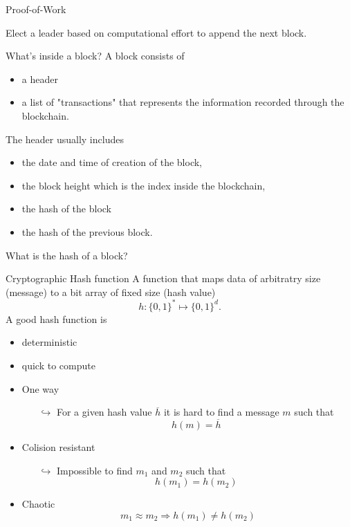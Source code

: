 \documentclass{beamer}
\begin{document}
\begin{frame}{Proof-of-Work}
\begin{tcolorbox}[enhanced,drop shadow, title=Objective]
    Elect a leader based on computational effort to append the next block.
\end{tcolorbox}
\end{frame}
\begin{frame}{What's inside a block?}
A block consists of 
\begin{itemize}
\item a header 
\item a list of "transactions" that represents the information recorded through the blockchain. 
\end{itemize}
The header usually includes 
\begin{itemize}
\item the date and time of creation of the block, 
\item the block height which is the index inside the blockchain, 
\item the hash of the block 
\item the hash of the previous block. 
\end{itemize}
\begin{tcolorbox}[enhanced,drop shadow, title=Question]
What is the hash of a block?
\end{tcolorbox}
\end{frame}
\begin{frame}{Cryptographic Hash function}
\small
A function that maps data of arbitratry size (message) to a bit array of fixed size (hash value)
$$
h:\{0,1\}^\ast\mapsto \{0,1\}^d. 
$$
A good hash function is
\begin{itemize}
\item deterministic
\item quick to compute
\item One way
\begin{itemize}
  \scriptsize
\item[$\hookrightarrow$] For a given hash value $\overline{h}$ it is hard to find a message $m$ such that 
$$
h(m) = \overline{h}
$$
\end{itemize}
\item Colision resistant 
\begin{itemize}
\item[$\hookrightarrow$] Impossible to find $m_1$ and $m_2$ such that 
$$
h(m_1) = h(m_2)
$$
\end{itemize}
\item Chaotic
$$m_1\approx m_2\Rightarrow  h(m_1) \neq h(m_2)$$
\end{itemize}
\end{frame}
\end{document}

